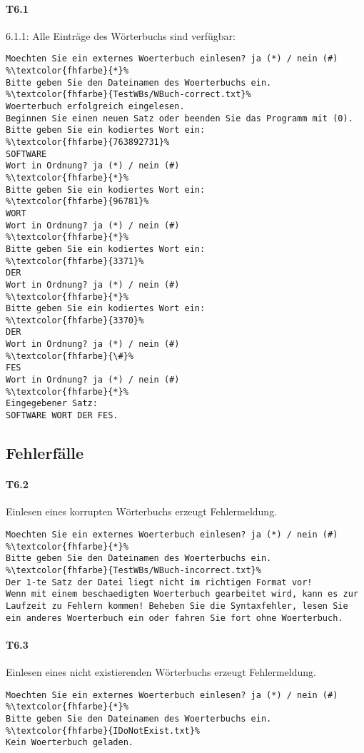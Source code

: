 \paragraph*{T6.1} 6.1.1: Alle Einträge des Wörterbuchs sind verfügbar:
\begin{lstlisting}[escapechar=\%]
Moechten Sie ein externes Woerterbuch einlesen? ja (*) / nein (#)
%\textcolor{fhfarbe}{*}%
Bitte geben Sie den Dateinamen des Woerterbuchs ein.
%\textcolor{fhfarbe}{TestWBs/WBuch-correct.txt}%
Woerterbuch erfolgreich eingelesen.
Beginnen Sie einen neuen Satz oder beenden Sie das Programm mit (0).
Bitte geben Sie ein kodiertes Wort ein:
%\textcolor{fhfarbe}{763892731}%
SOFTWARE
Wort in Ordnung? ja (*) / nein (#)
%\textcolor{fhfarbe}{*}%
Bitte geben Sie ein kodiertes Wort ein:
%\textcolor{fhfarbe}{96781}%
WORT
Wort in Ordnung? ja (*) / nein (#)
%\textcolor{fhfarbe}{*}%
Bitte geben Sie ein kodiertes Wort ein:
%\textcolor{fhfarbe}{3371}%
DER
Wort in Ordnung? ja (*) / nein (#)
%\textcolor{fhfarbe}{*}%
Bitte geben Sie ein kodiertes Wort ein:
%\textcolor{fhfarbe}{3370}%
DER
Wort in Ordnung? ja (*) / nein (#)
%\textcolor{fhfarbe}{\#}%
FES
Wort in Ordnung? ja (*) / nein (#)
%\textcolor{fhfarbe}{*}%
Eingegebener Satz:
SOFTWARE WORT DER FES.
\end{lstlisting}

\subsection*{Fehlerfälle}\label{subsec:wbuch-fehlerfaelle}
\paragraph*{T6.2} Einlesen eines korrupten Wörterbuchs erzeugt Fehlermeldung.
\begin{lstlisting}[escapechar=\%]
Moechten Sie ein externes Woerterbuch einlesen? ja (*) / nein (#)
%\textcolor{fhfarbe}{*}%
Bitte geben Sie den Dateinamen des Woerterbuchs ein.
%\textcolor{fhfarbe}{TestWBs/WBuch-incorrect.txt}%
Der 1-te Satz der Datei liegt nicht im richtigen Format vor!
Wenn mit einem beschaedigten Woerterbuch gearbeitet wird, kann es zur Laufzeit zu Fehlern kommen! Beheben Sie die Syntaxfehler, lesen Sie ein anderes Woerterbuch ein oder fahren Sie fort ohne Woerterbuch.
\end{lstlisting}

\paragraph*{T6.3} Einlesen eines nicht existierenden Wörterbuchs erzeugt Fehlermeldung.
\begin{lstlisting}[escapechar=\%]
Moechten Sie ein externes Woerterbuch einlesen? ja (*) / nein (#)
%\textcolor{fhfarbe}{*}%
Bitte geben Sie den Dateinamen des Woerterbuchs ein.
%\textcolor{fhfarbe}{IDoNotExist.txt}%
Kein Woerterbuch geladen.
\end{lstlisting}

